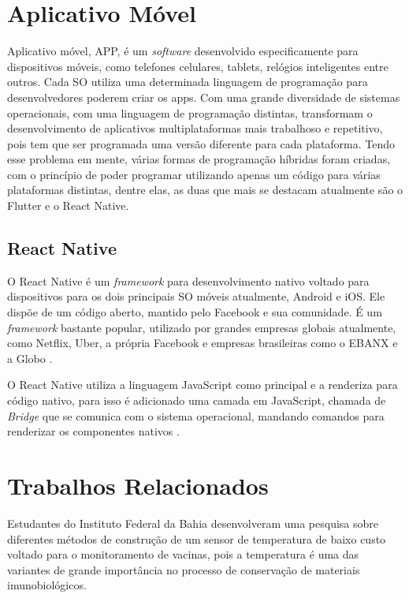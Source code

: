 \section{Aplicativo Móvel}
\label{fund:app}
Aplicativo móvel, APP, é um \textit{software} desenvolvido especificamente para dispositivos móveis, como telefones celulares, tablets, relógios inteligentes entre outros. Cada SO utiliza uma determinada linguagem de programação para desenvolvedores poderem criar os apps. Com uma grande diversidade de sistemas operacionais, com uma linguagem de programação distintas, transformam o desenvolvimento de aplicativos multiplataformas mais trabalhoso e repetitivo, pois tem que ser programada uma versão diferente para cada plataforma. Tendo esse problema em mente, várias formas de programação híbridas foram criadas, com o princípio de poder programar utilizando apenas um código para várias plataformas distintas, dentre elas, as duas que mais se destacam atualmente são o Flutter e o React Native.

\subsection{React Native}
\label{fund:react-native}
O React Native é um \textit{framework} para desenvolvimento nativo voltado para dispositivos para os dois principais SO móveis atualmente, Android e iOS. Ele dispõe de um código aberto, mantido pelo Facebook e sua comunidade. É um \textit{framework} bastante popular, utilizado por grandes empresas globais atualmente, como Netflix, Uber, a própria Facebook e empresas brasileiras como o EBANX e a Globo \cite{empresasbrreact}.

O React Native utiliza a linguagem JavaScript como principal e a renderiza para código nativo, para isso é adicionado uma camada em JavaScript, chamada de \textit{Bridge} que se comunica com o sistema operacional, mandando comandos para renderizar os componentes nativos \cite{docreactnative}.

\section{Trabalhos Relacionados}
\label{fund:trabalhos-relacionados}
Estudantes do Instituto Federal da Bahia desenvolveram uma pesquisa \cite{cruzdesenvolvimento} sobre diferentes métodos de construção de um sensor de temperatura de baixo custo voltado para o monitoramento de vacinas, pois a temperatura é uma das variantes de grande importância no  processo de conservação de materiais imunobiológicos.

